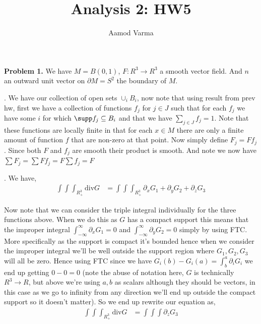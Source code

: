 \documentclass[a4paper]{article}
\title{Analysis 2: HW5}
\author{Aamod Varma}
\begin{document}
\maketitle
\textbf{Problem 1.}
We have $M = B(0, 1)$, $F: R^{3} \to R^{3}$ a smooth vector field. And $n$ an outward unit vector on $\partial M = S^2$ the boundary of $M$.

\vspace{1em}

. We have our collection of open sets $\cup_i B_i$, now note that using result from prev hw, first we have a collection of functions $f_j$  for $j \in J$ such that for each $f_j$ we have some $i$ for which $\supp f_j \subseteq B_i$ and that we have $\sum_{j \in J} f_j = 1$. Note that these functions are locally  finite in that for each $x \in M$ there are only a finite  amount of function $f$ that are non-zero at that point. Now simply define $F_j = F f_j$. Since both $F$ and $f_j$ are smooth their product is smooth. And note we now have $\sum F_j = \sum F f_j = F \sum f_j = F$

\vspace{1em}
. We have, 
\begin{align*}
  \int \int \int_{R_{+}^{3}}^{} \text{div} G &=\int \int \int_{R_{+}^{3}}^{} \partial_x G_1 + \partial_y G_2 + \partial_z G_3
\end{align*}

Now note that we can consider the triple integral individually for the three functions above. When we do this as $G$ has a compact support this means that the improper integral $\int_{-\infty}^{\infty} \partial_x G_1 = 0$ and $\int_{-\infty}^{\infty}\partial_y G_2 = 0$ simply by using FTC. More specifically as the support is compact it's bounded hence when we consider the improper integral we'll be well outside the support region where $G_1, G_2, G_3$ will all be zero. Hence using FTC since we have $G_i(b) - G_i(a) = \int_{b}^{a} \partial_i G_i$ we end up getting $0 - 0 = 0$ (note the abuse of notation here, $G$ is technically $R^{3} \to R$, but above we're using $a,b$ as scalars although they should be vectors, in this case as we go to infinity from any direction we'll end up outside the compact support so it doesn't matter). So we end up rewrite our equation as, 
\begin{align*}
  \int \int \int_{R_{+}^{3}}^{} \text{div} G &= \int\int\int \partial_z G_3
\end{align*}
\end{document}
